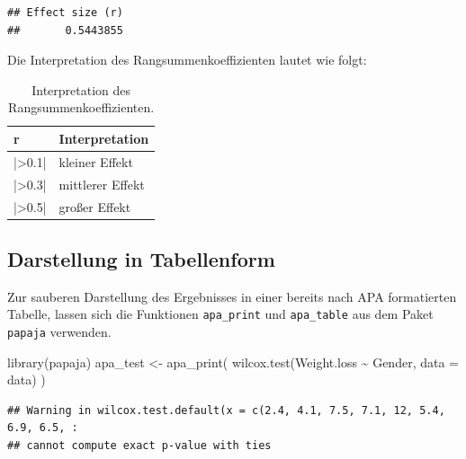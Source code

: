 \documentclass[
]{book}
\newenvironment{Shaded}{\begin{snugshade}}{\end{snugshade}}
\newcommand{\AttributeTok}[1]{\textcolor[rgb]{0.77,0.63,0.00}{#1}}
\newcommand{\FunctionTok}[1]{\textcolor[rgb]{0.00,0.00,0.00}{#1}}
\newcommand{\NormalTok}[1]{#1}
\newcommand{\OtherTok}[1]{\textcolor[rgb]{0.56,0.35,0.01}{#1}}
\newcommand{\SpecialCharTok}[1]{\textcolor[rgb]{0.00,0.00,0.00}{#1}}
\begin{document}
\begin{verbatim}
## Effect size (r) 
##       0.5443855
\end{verbatim}

Die Interpretation des Rangsummenkoeffizienten lautet wie folgt:

\begin{table}[tbp]

\begin{center}
\begin{threeparttable}

\caption{\label{tab:unnamed-chunk-271}Interpretation des Rangsummenkoeffizienten.}

\begin{tabular}{ll}
\toprule
r & \multicolumn{1}{c}{Interpretation}\\
\midrule
|>0.1| & kleiner Effekt\\
|>0.3| & mittlerer Effekt\\
|>0.5| & großer Effekt\\
\bottomrule
\end{tabular}

\end{threeparttable}
\end{center}

\end{table}

\hypertarget{darstellung-in-tabellenform-3}{%
\subsection{Darstellung in Tabellenform}\label{darstellung-in-tabellenform-3}}

Zur sauberen Darstellung des Ergebnisses in einer bereits nach APA formatierten Tabelle, lassen sich die Funktionen \texttt{apa\_print} und \texttt{apa\_table} aus dem Paket \texttt{papaja} verwenden.

\begin{Shaded}
\begin{Highlighting}[]
\FunctionTok{library}\NormalTok{(papaja)}
\NormalTok{apa\_test }\OtherTok{\textless{}{-}} \FunctionTok{apa\_print}\NormalTok{(}
 \FunctionTok{wilcox.test}\NormalTok{(Weight.loss }\SpecialCharTok{\textasciitilde{}}\NormalTok{ Gender, }\AttributeTok{data =}\NormalTok{ data)}
\NormalTok{)}
\end{Highlighting}
\end{Shaded}

\begin{verbatim}
## Warning in wilcox.test.default(x = c(2.4, 4.1, 7.5, 7.1, 12, 5.4, 6.9, 6.5, :
## cannot compute exact p-value with ties
\end{verbatim}
\end{document}
